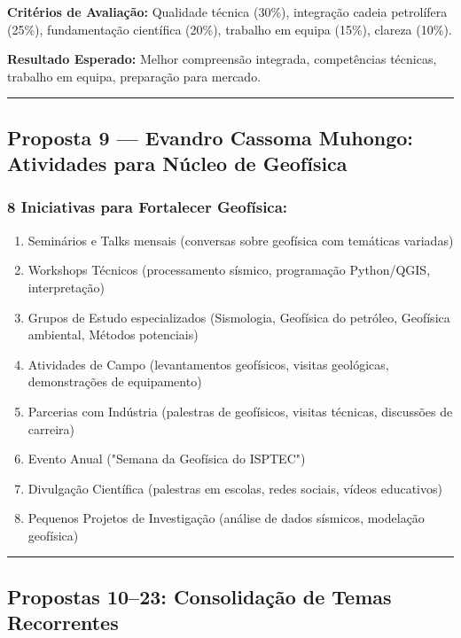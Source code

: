 \documentclass[12pt,a4paper]{article}
\begin{document}
\textbf{Critérios de Avaliação:} Qualidade técnica (30\%), integração cadeia petrolífera (25\%), fundamentação científica (20\%), trabalho em equipa (15\%), clareza (10\%).

\textbf{Resultado Esperado:} Melhor compreensão integrada, competências técnicas, trabalho em equipa, preparação para mercado.

\textcolor{spe-secondary}{\hspace{0.5cm}\rule{0.4\linewidth}{0.8pt}}

\subsection{Proposta 9 — Evandro Cassoma Muhongo: Atividades para Núcleo de Geofísica}

\subsubsection*{8 Iniciativas para Fortalecer Geofísica:}

\begin{enumerate}[itemsep=0.15cm]
    \item Seminários e Talks mensais (conversas sobre geofísica com temáticas variadas)
    \item Workshops Técnicos (processamento sísmico, programação Python/QGIS, interpretação)
    \item Grupos de Estudo especializados (Sismologia, Geofísica do petróleo, Geofísica ambiental, Métodos potenciais)
    \item Atividades de Campo (levantamentos geofísicos, visitas geológicas, demonstrações de equipamento)
    \item Parcerias com Indústria (palestras de geofísicos, visitas técnicas, discussões de carreira)
    \item Evento Anual ("Semana da Geofísica do ISPTEC")
    \item Divulgação Científica (palestras em escolas, redes sociais, vídeos educativos)
    \item Pequenos Projetos de Investigação (análise de dados sísmicos, modelação geofísica)
\end{enumerate}

\textcolor{spe-secondary}{\hspace{0.5cm}\rule{0.4\linewidth}{0.8pt}}

\subsection{Propostas 10–23: Consolidação de Temas Recorrentes}
\end{document}
